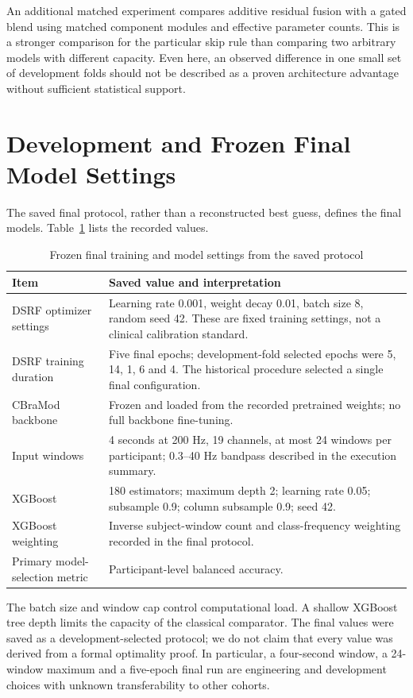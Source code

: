 An additional matched experiment compares additive residual fusion with a gated blend using matched component modules and effective parameter counts. This is a stronger comparison for the particular skip rule than comparing two arbitrary models with different capacity. Even here, an observed difference in one small set of development folds should not be described as a proven architecture advantage without sufficient statistical support.

\section{Development and Frozen Final Model Settings}
The saved final protocol, rather than a reconstructed best guess, defines the final models. Table~\ref{tab:hyperparams} lists the recorded values.
\begin{table}[htbp]\centering\small
\caption{Frozen final training and model settings from the saved protocol}\label{tab:hyperparams}
\begin{tabularx}{\textwidth}{@{}p{}X@{}}\toprule
\textbf{Item}&\textbf{Saved value and interpretation}\\\midrule
DSRF optimizer settings&Learning rate 0.001, weight decay 0.01, batch size 8, random seed 42. These are fixed training settings, not a clinical calibration standard.\\
DSRF training duration&Five final epochs; development-fold selected epochs were 5, 14, 1, 6 and 4. The historical procedure selected a single final configuration.\\
CBraMod backbone&Frozen and loaded from the recorded pretrained weights; no full backbone fine-tuning.\\
Input windows&4 seconds at 200 Hz, 19 channels, at most 24 windows per participant; 0.3--40 Hz bandpass described in the execution summary.\\
XGBoost&180 estimators; maximum depth 2; learning rate 0.05; subsample 0.9; column subsample 0.9; seed 42.\\
XGBoost weighting&Inverse subject-window count and class-frequency weighting recorded in the final protocol.\\
Primary model-selection metric&Participant-level balanced accuracy.\\
\bottomrule\end{tabularx}\end{table}

The batch size and window cap control computational load. A shallow XGBoost tree depth limits the capacity of the classical comparator. The final values were saved as a development-selected protocol; we do not claim that every value was derived from a formal optimality proof. In particular, a four-second window, a 24-window maximum and a five-epoch final run are engineering and development choices with unknown transferability to other cohorts.

